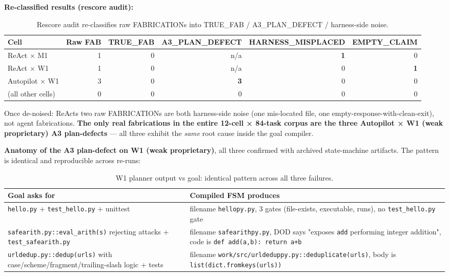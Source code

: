\textbf{Re-classified results (rescore audit):}

{\scriptsize\begin{longtable}[]{@{}lrrrrr@{}}
\caption{Rescore audit re-classifies raw FABRICATIONs into TRUE\_FAB / A3\_PLAN\_DEFECT / harness-side noise.}\label{tab:rescore}\\
\toprule\noalign{}
Cell & Raw FAB & TRUE\_FAB & A3\_PLAN\_DEFECT & HARNESS\_MISPLACED & EMPTY\_CLAIM \\
\midrule\noalign{}
\endhead
\bottomrule\noalign{}
\endlastfoot
ReAct × M1 & 1 & 0 & n/a & \textbf{1} & 0 \\
ReAct × W1 & 1 & 0 & n/a & 0 & \textbf{1} \\
Autopilot × W1 & 3 & 0 & \textbf{3} & 0 & 0 \\
(all other cells) & 0 & 0 & 0 & 0 & 0 \\
\end{longtable}}

Once de-noised: ReAct\textquotesingle s two raw FABRICATIONs are both harness-side noise (one mis-located file,
one empty-response-with-clean-exit), not agent fabrications. \textbf{The only real fabrications in the
entire 12-cell × 84-task corpus are the three Autopilot × W1 (weak proprietary) A3 plan-defects} ---
all three exhibit the \emph{same} root cause inside the goal compiler.

\textbf{Anatomy of the A3 plan-defect on W1 (weak proprietary)}, all three confirmed with archived
state-machine artifacts. The pattern is identical and reproducible across re-runs:

{\scriptsize\begin{longtable}[]{@{}p{} p{}@{}}
\caption{W1 planner output vs goal: identical pattern across all three failures.}\label{tab:w1-anatomy}\\
\toprule\noalign{}
Goal asks for & Compiled FSM produces \\
\midrule\noalign{}
\endhead
\bottomrule\noalign{}
\endlastfoot
\texttt{hello.py} + \texttt{test\_hello.py} + unittest & filename \texttt{hellopy.py}, 3 gates (file-exists, executable, runs), no \texttt{test\_hello.py} gate \\
\texttt{safearith.py::eval\_arith(s)} rejecting attacks + \texttt{test\_safearith.py} & filename \texttt{safearithpy.py}, DOD says "exposes \texttt{add} performing integer addition", code is \texttt{def\ add(a,b):\ return\ a+b} \\
\texttt{urldedup.py::dedup(urls)} with case/scheme/fragment/trailing-slash logic + tests & filename \texttt{work/src/urldeduppy.py::deduplicate(urls)}, body is \texttt{list(dict.fromkeys(urls))} \\
\end{longtable}}

